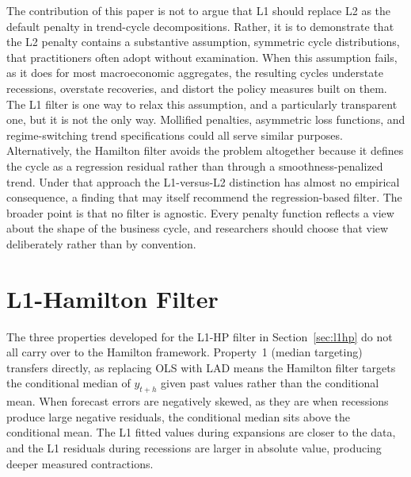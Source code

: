 \documentclass[10pt]{article}
\begin{document}
The contribution of this paper is not to argue that L1 should replace L2 as the default penalty in trend-cycle decompositions. Rather, it is to demonstrate that the L2 penalty contains a substantive assumption, symmetric cycle distributions, that practitioners often adopt without examination. When this assumption fails, as it does for most macroeconomic aggregates, the resulting cycles understate recessions, overstate recoveries, and distort the policy measures built on them. The L1 filter is one way to relax this assumption, and a particularly transparent one, but it is not the only way. Mollified penalties, asymmetric loss functions, and regime-switching trend specifications could all serve similar purposes. Alternatively, the Hamilton filter avoids the problem altogether because it defines the cycle as a regression residual rather than through a smoothness-penalized trend. Under that approach the L1-versus-L2 distinction has almost no empirical consequence, a finding that may itself recommend the regression-based filter. The broader point is that no filter is agnostic. Every penalty function reflects a view about the shape of the business cycle, and researchers should choose that view deliberately rather than by convention.

\newpage




\newpage
\appendix


\section{L1-Hamilton Filter}
\label{app:hamilton}

The three properties developed for the L1-HP filter in Section~\ref{sec:l1hp} do not all carry over to the Hamilton framework. Property~1 (median targeting) transfers directly, as replacing OLS with LAD means the Hamilton filter targets the conditional median of $y_{t+h}$ given past values rather than the conditional mean. When forecast errors are negatively skewed, as they are when recessions produce large negative residuals, the conditional median sits above the conditional mean. The L1 fitted values during expansions are closer to the data, and the L1 residuals during recessions are larger in absolute value, producing deeper measured contractions.
\end{document}
